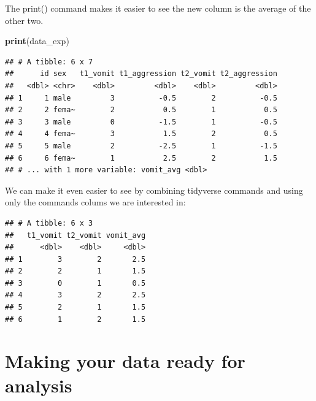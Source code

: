 \documentclass[
]{krantz}
\makeatletter
\newenvironment{Shaded}{\begin{snugshade}}{\end{snugshade}}
\newcommand{\KeywordTok}[1]{\textcolor[rgb]{0.27,0.27,0.27}{\textbf{#1}}}
\newcommand{\NormalTok}[1]{#1}
\newcommand{\OperatorTok}[1]{\textcolor[rgb]{0.43,0.43,0.43}{\textbf{#1}}}
\newcommand{\StringTok}[1]{\textcolor[rgb]{0.5,0.5,0.5}{#1}}
\newenvironment{kframe}{%
\medskip{}
\setlength{\fboxsep}{.8em}
 \def\at@end@of@kframe{}%
 \ifinner\ifhmode%
  \def\at@end@of@kframe{\end{minipage}}%
  \begin{minipage}{\columnwidth}%
 \fi\fi%
 \def\FrameCommand##1{\hskip\@totalleftmargin \hskip-\fboxsep
 \colorbox{shadecolor}{##1}\hskip-\fboxsep
     \hskip-\linewidth \hskip-\@totalleftmargin \hskip\columnwidth}%
 \MakeFramed {\advance\hsize-\width
   \@totalleftmargin\z@ \linewidth\hsize
   \@setminipage}}%
 {\par\unskip\endMakeFramed%
 \at@end@of@kframe}
\renewenvironment{Shaded}{\begin{kframe}}{\end{kframe}}
\makeatother
\begin{document}
The print() command makes it easier to see the new column is the average of the other two.

\begin{Shaded}
\begin{Highlighting}[]
\KeywordTok{print}\NormalTok{(data_exp)}
\end{Highlighting}
\end{Shaded}

\begin{verbatim}
## # A tibble: 6 x 7
##      id sex   t1_vomit t1_aggression t2_vomit t2_aggression
##   <dbl> <chr>    <dbl>         <dbl>    <dbl>         <dbl>
## 1     1 male         3          -0.5        2          -0.5
## 2     2 fema~        2           0.5        1           0.5
## 3     3 male         0          -1.5        1          -0.5
## 4     4 fema~        3           1.5        2           0.5
## 5     5 male         2          -2.5        1          -1.5
## 6     6 fema~        1           2.5        2           1.5
## # ... with 1 more variable: vomit_avg <dbl>
\end{verbatim}

We can make it even easier to see by combining tidyverse commands and using only the commands colums we are interested in:

\begin{Shaded}
\end{Shaded}

\begin{verbatim}
## # A tibble: 6 x 3
##   t1_vomit t2_vomit vomit_avg
##      <dbl>    <dbl>     <dbl>
## 1        3        2       2.5
## 2        2        1       1.5
## 3        0        1       0.5
## 4        3        2       2.5
## 5        2        1       1.5
## 6        1        2       1.5
\end{verbatim}

\hypertarget{making-your-data-ready-for-analysis}{%
\chapter{Making your data ready for analysis}\label{making-your-data-ready-for-analysis}}
\end{document}
